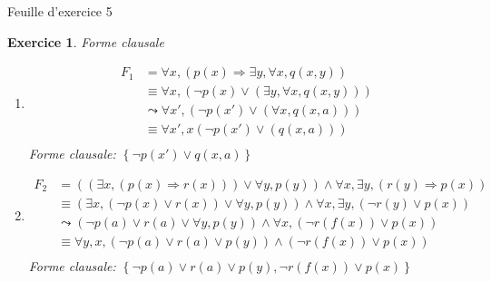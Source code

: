 \documentclass{article}
\theoremstyle{plain}
\newtheorem{exo}{Exercice}%
\begin{document}
\begin{center}
    \large\sc Feuille d'exercice 5
\end{center}

\begin{exo} Forme clausale
\begin{enumerate}
    \item \begin{align*}
        F_1 &=\forall x, (p(x) \Rightarrow \exists y, \forall x, q(x, y)) \\
            &\equiv \forall x, (\neg p(x) \vee (\exists y, \forall x, q(x, y))) \\
            &\leadsto  \forall x', (\neg p(x') \vee (\forall x, q(x, a))) \\
            &\equiv \forall x', x (\neg p(x') \vee (q(x, a))) \\
    \end{align*}
    Forme clausale: $\left\{\neg p(x') \vee q(x, a)\right\}$

    \item \begin{align*}
        F_2 &= ((\exists x, (p(x) \Rightarrow r(x))) \vee \forall y, p(y)) \wedge 
                    \forall x, \exists y, (r(y) \Rightarrow p(x)) \\
            &\equiv (\exists x, (\neg p(x) \vee r(x)) \vee \forall y, p(y)) \wedge 
                    \forall x, \exists y, (\neg r(y) \vee p(x)) \\
            &\leadsto (\neg p(a) \vee r(a) \vee \forall y, p(y)) \wedge 
                    \forall x, (\neg r(f(x)) \vee p(x)) \\
            &\equiv \forall y, x, (\neg p(a) \vee r(a) \vee p(y)) \wedge 
                    (\neg r(f(x)) \vee p(x)) \\
    \end{align*}
    Forme clausale: $\left\{\neg p(a) \vee r(a) \vee p(y), \neg r(f(x)) \vee p(x)\right\}$


\end{enumerate}
\end{exo}
\end{document}
